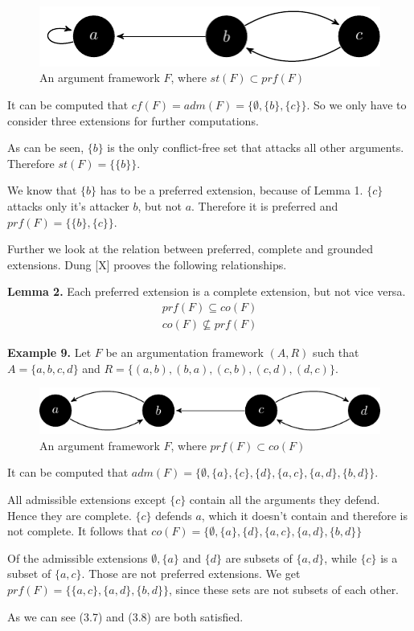 \documentclass[draft,final]{vutinfth} %
\newcommand{\hl}{\par\vspace{6pt}} %
\newcommand{\cl}{\par\vspace{12pt}} %
\begin{document}
\FloatBarrier
	\begin{figure}[!h]
		\centering
		\includegraphics[width=\linewidth]{graphs/ex2_v2.pdf}
		\caption{An argument framework $F$, where $st(F)\subset prf(F)$}
	\end{figure}
\FloatBarrier

It can be computed that $cf(F)=adm(F)=\{\emptyset,\{b\},\{c\}\}$. So we only have to consider three extensions for further computations.\hl
As can be seen, $\{b\}$ is the only conflict-free set that attacks all other arguments. Therefore $st(F)=\{\{b\}\}$.\hl
We know that $\{b\}$ has to be a preferred extension, because of Lemma 1. $\{c\}$ attacks only it's attacker $b$, but not $a$. Therefore it is preferred and $prf(F)=\{\{b\},\{c\}\}$.\cl

Further we look at the relation between preferred, complete and grounded extensions. Dung [X] prooves the following relationships.\hl %

\textbf{Lemma 2.}
Each preferred extension is a complete extension, but not vice versa.
\begin{align}
	prf(F)\subseteq co(F)\\
	co(F)\not\subseteq prf(F)
\end{align}\hl

\textbf{Example 9.} Let $F$ be an argumentation framework $(A,R)$ such that $A=\{a,b,c,d\}$ and $R=\{(a,b),(b,a),(c,b),(c,d),(d,c)\}$.\hl

\FloatBarrier
	\begin{figure}[!h]
		\centering
		\includegraphics[width=\linewidth]{graphs/ex3.pdf}
		\caption{An argument framework $F$, where $prf(F)\subset co(F)$}
	\end{figure}
\FloatBarrier

It can be computed that $adm(F)=\{\emptyset,\{a\},\{c\},\{d\},\{a,c\},\{a,d\},\{b,d\}\}$.\hl
All admissible extensions except $\{c\}$ contain all the arguments they defend. Hence they are complete. $\{c\}$ defends $a$, which it doesn't contain and therefore is not complete. It follows that $co(F)=\{\emptyset,\{a\},\{d\},\{a,c\},\{a,d\},\{b,d\}\}$\hl
Of the admissible extensions $\emptyset,\{a\}$ and $\{d\}$ are subsets of $\{a,d\}$, while $\{c\}$ is a subset of $\{a,c\}$. Those are not preferred extensions. We get $prf(F)=\{\{a,c\},\{a,d\},\{b,d\}\}$, since these sets are not subsets of each other.\hl
As we can see (3.7) and (3.8) are both satisfied.\cl
\end{document}
